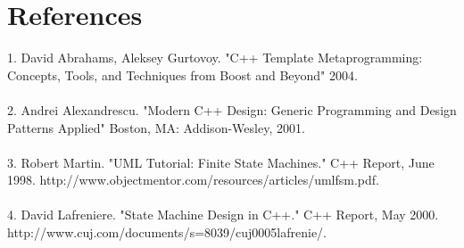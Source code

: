 \chapter{References}

1. David Abrahams, Aleksey Gurtovoy. "C++ Template Metaprogramming: Concepts, Tools, and Techniques from Boost and Beyond" 2004.\\
\\
2. Andrei Alexandrescu. "Modern C++ Design: Generic Programming and Design Patterns Applied" Boston, MA: Addison-Wesley, 2001.\\
\\
3. Robert Martin. "UML Tutorial: Finite State Machines." C++ Report, June 1998. http://www.objectmentor.com/resources/articles/umlfsm.pdf.\\
\\
4. David Lafreniere. "State Machine Design in C++." C++ Report, May 2000. http://www.cuj.com/documents/s=8039/cuj0005lafrenie/.\\

